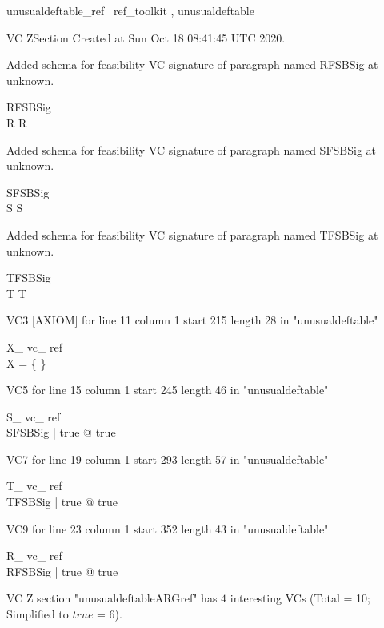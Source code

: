 \documentclass{article}
\begin{document}

\begin{zsection}	 \SECTION unusualdeftable\_ref \parents~ref\_toolkit , unusualdeftable
\end{zsection}

VC ZSection Created at Sun Oct 18 08:41:45 UTC 2020.


Added schema for feasibility VC signature of paragraph named RFSBSig at unknown.
\begin{schema}{RFSBSig}
\\
 R 
\where
 R
\end{schema}


Added schema for feasibility VC signature of paragraph named SFSBSig at unknown.
\begin{schema}{SFSBSig}
\\
 S 
\where
 S
\end{schema}


Added schema for feasibility VC signature of paragraph named TFSBSig at unknown.
\begin{schema}{TFSBSig}
\\
 T 
\where
 T
\end{schema}

VC3 [AXIOM] for line 11 column 1 start 215 length 28 in "unusualdeftable"
\begin{theorem}{ X\_ vc\_ ref}\\
 \lnot X = \{ \} \\

\end{theorem}

VC5 for line 15 column 1 start 245 length 46 in "unusualdeftable"
\begin{theorem}{ S\_ vc\_ ref}\\
 \exists SFSBSig | true @ true \\

\end{theorem}

VC7 for line 19 column 1 start 293 length 57 in "unusualdeftable"
\begin{theorem}{ T\_ vc\_ ref}\\
 \exists TFSBSig | true @ true \\

\end{theorem}

VC9 for line 23 column 1 start 352 length 43 in "unusualdeftable"
\begin{theorem}{ R\_ vc\_ ref}\\
 \exists RFSBSig | true @ true \\

\end{theorem}



 VC Z section "unusualdeftableARGref" has $4$ interesting VCs (Total = 10; Simplified to $true$ = 6).



\end{document}
